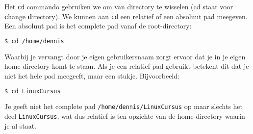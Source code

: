 Het \texttt{cd} commando gebruiken we om van directory te wisselen (cd staat voor \textbf{c}hange \textbf{d}irectory). We kunnen aan \texttt{cd} een relatief of een absoluut pad meegeven. Een absoluut pad is het complete pad vanaf de root-directory:
\begin{lstlisting}[language=bash]
$ cd /home/dennis
\end{lstlisting}
Waarbij je  vervangt door je eigen gebruikersnaam zorgt ervoor dat je in je eigen home-directory komt te staan. Als je een relatief pad gebruikt betekent dit dat je niet het hele pad meegeeft, maar een stukje. Bijvoorbeeld:
\begin{lstlisting}[language=bash]
$ cd LinuxCursus
\end{lstlisting}
Je geeft niet het complete pad \texttt{/home/dennis/LinuxCursus} op maar slechts het deel \texttt{LinuxCursus}, wat dus relatief is ten opzichte van de home-directory waarin je al staat.


